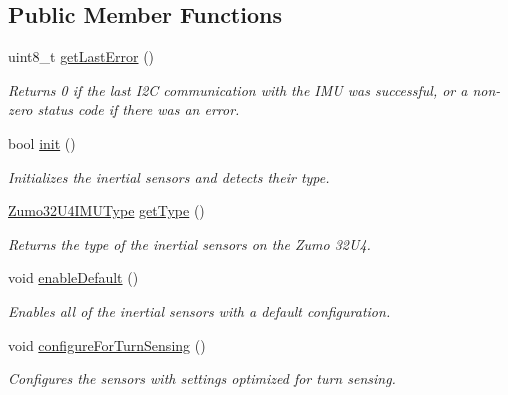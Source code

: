 \subsection*{Public Member Functions}
\begin{DoxyCompactItemize}
\item 
\mbox{\label{class_zumo32_u4_i_m_u_ad00f3ac13787ecb7cc0c3b7d4428fd5b}} 
uint8\+\_\+t \hyperlink{class_zumo32_u4_i_m_u_ad00f3ac13787ecb7cc0c3b7d4428fd5b}{get\+Last\+Error} ()
\begin{DoxyCompactList}\small\item\em Returns 0 if the last I2C communication with the I\+MU was successful, or a non-\/zero status code if there was an error. \end{DoxyCompactList}\item 
bool \hyperlink{class_zumo32_u4_i_m_u_aca2ae4fe4989453c2e4f73e9dc7439d2}{init} ()
\begin{DoxyCompactList}\small\item\em Initializes the inertial sensors and detects their type. \end{DoxyCompactList}\item 
\hyperlink{_zumo32_u4_i_m_u_8h_a2be3e50a86f638af5bb120cc740f3452}{Zumo32\+U4\+I\+M\+U\+Type} \hyperlink{class_zumo32_u4_i_m_u_a936427abfbed839c5669746d274427bd}{get\+Type} ()
\begin{DoxyCompactList}\small\item\em Returns the type of the inertial sensors on the Zumo 32\+U4. \end{DoxyCompactList}\item 
\mbox{\label{class_zumo32_u4_i_m_u_acfb1ce51ff908de9635ccbc3652a3fbb}} 
void \hyperlink{class_zumo32_u4_i_m_u_acfb1ce51ff908de9635ccbc3652a3fbb}{enable\+Default} ()
\begin{DoxyCompactList}\small\item\em Enables all of the inertial sensors with a default configuration. \end{DoxyCompactList}\item 
\mbox{\label{class_zumo32_u4_i_m_u_ad166edc8fb6304c2f5329ebc490f21ad}} 
void \hyperlink{class_zumo32_u4_i_m_u_ad166edc8fb6304c2f5329ebc490f21ad}{configure\+For\+Turn\+Sensing} ()
\begin{DoxyCompactList}\small\item\em Configures the sensors with settings optimized for turn sensing. \end{DoxyCompactList}\item 

\end{DoxyCompactItemize}

